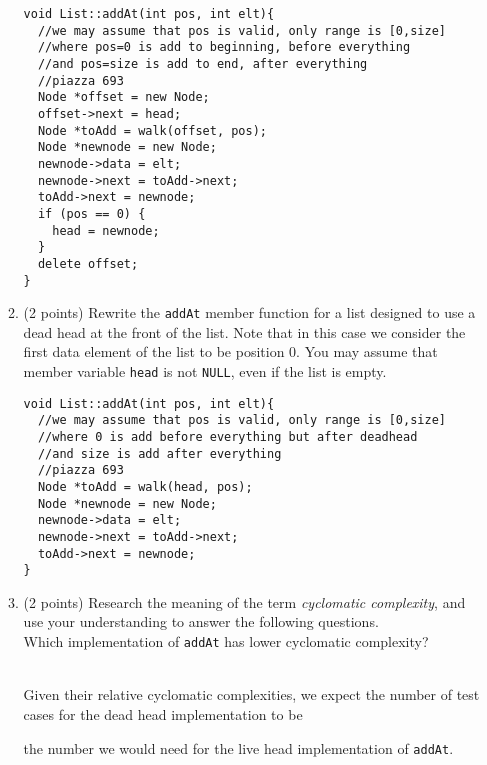 \documentclass[11pt,table]{article}
\newcommand{\fillinMC}[1]{\fillinMCmath{\mbox{#1}}}
\newcommand{\fillinMCmath}[1]{\begin{tikzpicture}\draw circle [radius=0.35em];\end{tikzpicture}\ #1}
\newcommand{\filledMC}[1]{\filledMCmath{\mbox{#1}}}
\newcommand{\filledMCmath}[1]{\begin{tikzpicture}\draw[fill=black] circle [radius=0.35em];\end{tikzpicture}\ #1}
\begin{document}
\begin{enumerate}
\begin{enumerate}
\begin{Verbatim}[frame=single,framerule=2pt]
void List::addAt(int pos, int elt){
  //we may assume that pos is valid, only range is [0,size]
  //where pos=0 is add to beginning, before everything
  //and pos=size is add to end, after everything
  //piazza 693
  Node *offset = new Node;
  offset->next = head;
  Node *toAdd = walk(offset, pos);
  Node *newnode = new Node;
  newnode->data = elt;
  newnode->next = toAdd->next;
  toAdd->next = newnode;
  if (pos == 0) {
    head = newnode;
  }
  delete offset;
}
\end{Verbatim}

\item (2 points)
Rewrite the \texttt{addAt} member function for a list designed to use a dead head at the front of the list. Note that in this case we consider the first data element of the list to be position 0.
You may assume that member variable \texttt{head} is not \texttt{NULL}, even if the list is empty.
 
\begin{Verbatim}[frame=single,framerule=2pt]
void List::addAt(int pos, int elt){
  //we may assume that pos is valid, only range is [0,size]
  //where 0 is add before everything but after deadhead
  //and size is add after everything
  //piazza 693
  Node *toAdd = walk(head, pos);
  Node *newnode = new Node;
  newnode->data = elt;
  newnode->next = toAdd->next;
  toAdd->next = newnode;
}
\end{Verbatim}

\item (2 points) Research the meaning of the term \emph{cyclomatic complexity}, and use your understanding to answer the following questions.\\

Which implementation of \texttt{addAt} has lower cyclomatic complexity?\\
\\

Given their relative cyclomatic complexities, we expect the number of test cases for the dead head implementation to be  the number we would need for the live head implementation of \texttt{addAt}.


\end{enumerate}
\end{enumerate}
\end{document}
